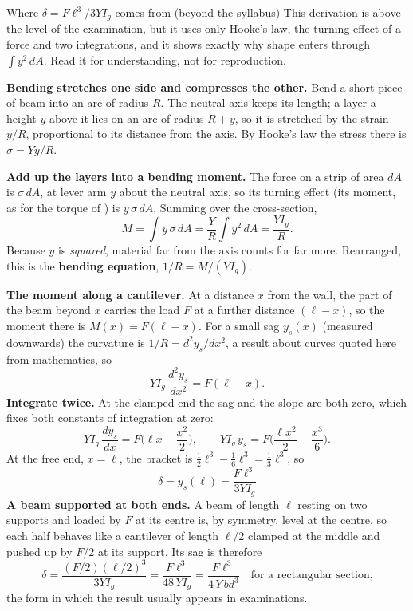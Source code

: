 \begin{derivbox}{Where $\delta=F\ell^{3}/3YI_g$ comes from (beyond the syllabus)}
This derivation is above the level of the examination, but it uses only Hooke's law, the turning effect
of a force and two integrations, and it shows exactly why shape enters through $\int y^{2}\,dA$. Read it
for understanding, not for reproduction.

 \textbf{Bending stretches one side and compresses the other.} Bend a short piece of beam into an
arc of radius $R$. The neutral axis keeps its length; a layer a height $y$ above it lies on an arc of
radius $R+y$, so it is stretched by the strain $y/R$, proportional to its distance from the axis. By
Hooke's law the stress there is $\sigma=Yy/R$.

 \textbf{Add up the layers into a bending moment.} The force on a strip of area $dA$ is
$\sigma\,dA$, at lever arm $y$ about the neutral axis, so its turning effect (its moment, as for the torque
of ) is $y\,\sigma\,dA$. Summing over the cross-section,
\[
M=\int y\,\sigma\,dA=\frac{Y}{R}\int y^{2}\,dA=\frac{YI_g}{R}.
\]
Because $y$ is \emph{squared}, material far from the axis counts for far more. Rearranged, this is the
\textbf{bending equation}, $1/R=M/(YI_g)$.

 \textbf{The moment along a cantilever.} At a distance $x$ from the wall, the part of the beam
beyond $x$ carries the load $F$ at a further distance $(\ell-x)$, so the moment there is $M(x)=F(\ell-x)$.
For a small sag $y_s(x)$ (measured downwards) the curvature is $1/R=d^{2}y_s/dx^{2}$, a result about
curves quoted here from mathematics, so
\[
YI_g\,\frac{d^{2}y_s}{dx^{2}}=F(\ell-x).
\]
 \textbf{Integrate twice.} At the clamped end the sag and the slope are both zero, which fixes
both constants of integration at zero:
\[
YI_g\,\frac{dy_s}{dx}=F\Big(\ell x-\frac{x^{2}}{2}\Big),\qquad
YI_g\,y_s=F\Big(\frac{\ell x^{2}}{2}-\frac{x^{3}}{6}\Big).
\]
At the free end, $x=\ell$, the bracket is $\tfrac12\ell^{3}-\tfrac16\ell^{3}=\tfrac13\ell^{3}$, so
\[
\boxed{\;\delta=y_s(\ell)=\frac{F\ell^{3}}{3YI_g}\;}
\]
 \textbf{A beam supported at both ends.} A beam of length $\ell$ resting on two supports and
loaded by $F$ at its centre is, by symmetry, level at the centre, so each half behaves like a cantilever of
length $\ell/2$ clamped at the middle and pushed up by $F/2$ at its support. Its sag is therefore
\[
\delta=\frac{(F/2)(\ell/2)^{3}}{3YI_g}=\frac{F\ell^{3}}{48\,YI_g}=\frac{F\ell^{3}}{4\,Y\,bd^{3}}
\quad\text{for a rectangular section,}
\]
the form in which the result usually appears in examinations.
\end{derivbox}

